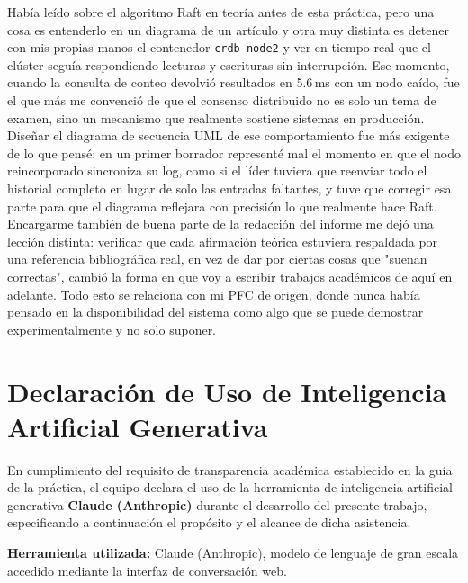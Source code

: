 \documentclass[12pt, a4paper]{article}
\begin{document}
Había leído sobre el algoritmo Raft en teoría antes de esta práctica, pero una cosa es entenderlo en un diagrama de un artículo y otra muy distinta es detener con mis propias manos el contenedor \texttt{crdb-node2} y ver en tiempo real que el clúster seguía respondiendo lecturas y escrituras sin interrupción. Ese momento, cuando la consulta de conteo devolvió resultados en 5.6\,ms con un nodo caído, fue el que más me convenció de que el consenso distribuido no es solo un tema de examen, sino un mecanismo que realmente sostiene sistemas en producción. Diseñar el diagrama de secuencia UML de ese comportamiento fue más exigente de lo que pensé: en un primer borrador representé mal el momento en que el nodo reincorporado sincroniza su log, como si el líder tuviera que reenviar todo el historial completo en lugar de solo las entradas faltantes, y tuve que corregir esa parte para que el diagrama reflejara con precisión lo que realmente hace Raft. Encargarme también de buena parte de la redacción del informe me dejó una lección distinta: verificar que cada afirmación teórica estuviera respaldada por una referencia bibliográfica real, en vez de dar por ciertas cosas que "suenan correctas", cambió la forma en que voy a escribir trabajos académicos de aquí en adelante. Todo esto se relaciona con mi PFC de origen, donde nunca había pensado en la disponibilidad del sistema como algo que se puede demostrar experimentalmente y no solo suponer.

\section{Declaración de Uso de Inteligencia Artificial Generativa}
\label{declaracion-ia}

En cumplimiento del requisito de transparencia académica establecido en la guía de la práctica, el equipo declara el uso de la herramienta de inteligencia artificial generativa \textbf{Claude (Anthropic)} durante el desarrollo del presente trabajo, especificando a continuación el propósito y el alcance de dicha asistencia.

\textbf{Herramienta utilizada:} Claude (Anthropic), modelo de lenguaje de gran escala accedido mediante la interfaz de conversación web.
\end{document}
